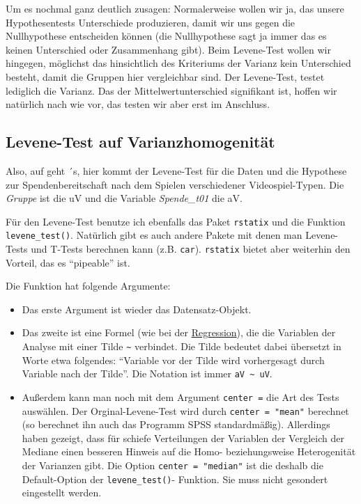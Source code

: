 \documentclass[
]{book}
\begin{document}
Um es nochmal ganz deutlich zusagen: Normalerweise wollen wir ja, das unsere Hypothesentests Unterschiede produzieren, damit wir uns gegen die Nullhypothese entscheiden können (die Nullhypothese sagt ja immer das es keinen Unterschied oder Zusammenhang gibt). Beim Levene-Test wollen wir hingegen, möglichst das hinsichtlich des Kriteriums der Varianz kein Unterschied besteht, damit die Gruppen hier vergleichbar sind. Der Levene-Test, testet lediglich die Varianz. Das der Mittelwertunterschied signifikant ist, hoffen wir natürlich nach wie vor, das testen wir aber erst im Anschluss.

\hypertarget{levene-test-auf-varianzhomogenituxe4t}{%
\subsection{Levene-Test auf Varianzhomogenität}\label{levene-test-auf-varianzhomogenituxe4t}}

Also, auf geht ´s, hier kommt der Levene-Test für die Daten und die Hypothese zur Spendenbereitschaft nach dem Spielen verschiedener Videospiel-Typen. Die \emph{Gruppe} ist die uV und die Variable \emph{Spende\_t01} die aV.

Für den Levene-Test benutze ich ebenfalls das Paket \texttt{rstatix} und die Funktion \texttt{levene\_test()}. Natürlich gibt es auch andere Pakete mit denen man Levene-Tests und T-Tests berechnen kann (z.B. \texttt{car}). \texttt{rstatix} bietet aber weiterhin den Vorteil, das es ``pipeable'' ist.

Die Funktion hat folgende Argumente:

\begin{itemize}
\item
  Das erste Argument ist wieder das Datensatz-Objekt.
\item
  Das zweite ist eine Formel (wie bei der \protect\hyperlink{regression}{Regression}), die die Variablen der Analyse mit einer Tilde \texttt{\textasciitilde{}} verbindet. Die Tilde bedeutet dabei übersetzt in Worte etwa folgendes: ``Variable vor der Tilde wird vorhergesagt durch Variable nach der Tilde''. Die Notation ist immer \texttt{aV\ \textasciitilde{}\ uV}.
\item
  Außerdem kann man noch mit dem Argument \texttt{center\ =} die Art des Tests auswählen. Der Orginal-Levene-Test wird durch \texttt{center\ =\ "mean"} berechnet (so berechnet ihn auch das Programm SPSS standardmäßig). Allerdings haben \citep{Brown_1974} gezeigt, dass für schiefe Verteilungen der Variablen der Vergleich der Mediane einen besseren Hinweis auf die Homo- beziehungsweise Heterogenität der Varianzen gibt. Die Option \texttt{center\ =\ "median"} ist die deshalb die Default-Option der \texttt{levene\_test()}- Funktion. Sie muss nicht gesondert eingestellt werden.
\end{itemize}
\end{document}
